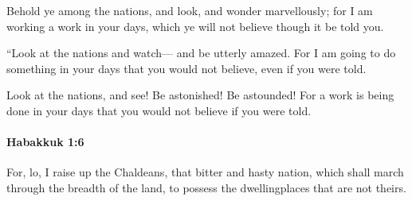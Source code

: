 			\begin{versebox}
					\item[BHS] 
					\item[LXX] 
					\item[ASV] Behold ye among the nations, and look, and wonder marvellously; for I am working a work in your days, which ye will not believe though it be told you.
					\item[NIV] “Look at the nations and watch— and be utterly amazed. For I am going to do something in your days that you would not believe, even if you were told.
					\item[NRSV] Look at the nations, and see! Be astonished! Be astounded! For a work is being done in your days that you would not believe if you were told.
			\end{versebox}

		\paragraph{Habakkuk 1:6} %
			\label{HABAKKUK-1-6}

			For, lo, I raise up the Chaldeans, that bitter and hasty nation, which shall march through the breadth of the land, to possess the dwellingplaces that are not theirs.

